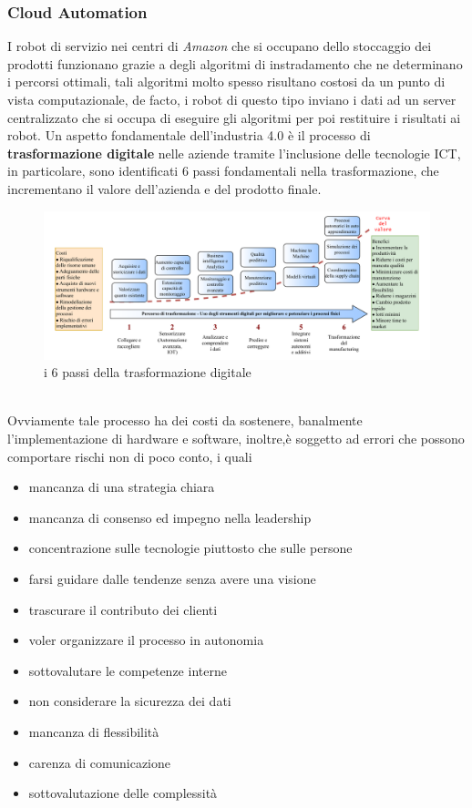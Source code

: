 \documentclass[10pt, letterpaper]{report}
\begin{document}
\subsubsection{Cloud Automation}
I robot di servizio nei centri di \textit{Amazon} che si occupano dello stoccaggio 
dei prodotti funzionano grazie a degli algoritmi di instradamento che 
ne determinano i percorsi ottimali, tali algoritmi molto spesso risultano 
costosi da un punto di vista computazionale, de facto, i robot di questo tipo 
inviano i dati ad un server centralizzato che si occupa di eseguire gli algoritmi per 
poi restituire i risultati ai robot.\acc 
Un aspetto fondamentale dell'industria 4.0 è il processo di 
\textbf{trasformazione digitale} nelle aziende tramite l'inclusione delle 
tecnologie ICT, in particolare, sono identificati 6 passi 
fondamentali nella trasformazione, che incrementano il valore 
dell'azienda e del prodotto finale.
\\\begin{figure}[h!]
    \centering
    \includegraphics[width=1\textwidth ]{images/trasformazioneDigitale.pdf}
    \caption{i 6 passi della trasformazione digitale}
\end{figure}\\
 Ovviamente tale processo ha dei costi da sostenere, banalmente 
 l'implementazione di hardware e software, inoltre,è soggetto 
 ad errori che possono comportare rischi non di poco conto, i quali\begin{itemize}
    \item mancanza di una strategia chiara 
    \item mancanza di consenso ed impegno nella leadership
    \item concentrazione sulle tecnologie piuttosto che sulle persone 
    \item farsi guidare dalle tendenze senza avere una visione
    \item trascurare il contributo dei clienti
    \item voler organizzare il processo in autonomia 
    \item sottovalutare le competenze interne 
    \item non considerare la sicurezza dei dati 
    \item mancanza di flessibilità 
    \item carenza di comunicazione 
    \item sottovalutazione delle complessità
 \end{itemize}
\end{document}
